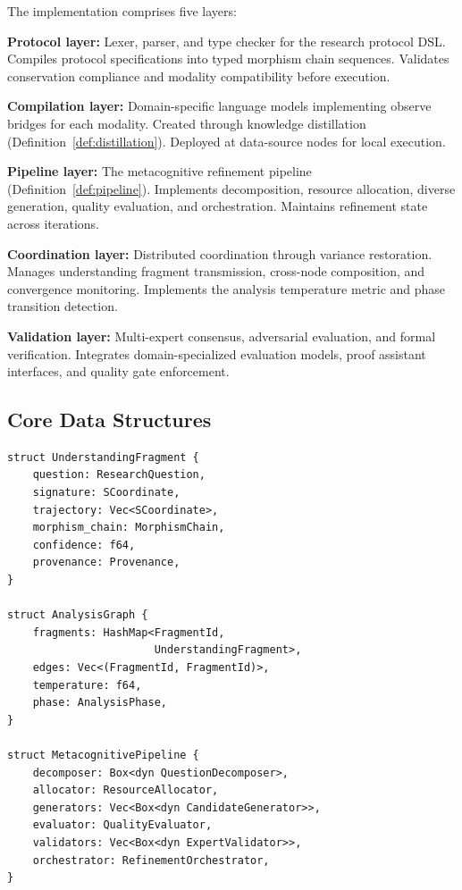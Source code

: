 \documentclass[10pt,twocolumn]{article}
\theoremstyle{definition}
\theoremstyle{remark}
\begin{document}
The implementation comprises five layers:

\textbf{Protocol layer:} Lexer, parser, and type checker for the research protocol DSL. Compiles protocol specifications into typed morphism chain sequences. Validates conservation compliance and modality compatibility before execution.

\textbf{Compilation layer:} Domain-specific language models implementing observe bridges for each modality. Created through knowledge distillation (Definition~\ref{def:distillation}). Deployed at data-source nodes for local execution.

\textbf{Pipeline layer:} The metacognitive refinement pipeline (Definition~\ref{def:pipeline}). Implements decomposition, resource allocation, diverse generation, quality evaluation, and orchestration. Maintains refinement state across iterations.

\textbf{Coordination layer:} Distributed coordination through variance restoration. Manages understanding fragment transmission, cross-node composition, and convergence monitoring. Implements the analysis temperature metric and phase transition detection.

\textbf{Validation layer:} Multi-expert consensus, adversarial evaluation, and formal verification. Integrates domain-specialized evaluation models, proof assistant interfaces, and quality gate enforcement.

\subsection{Core Data Structures}

\begin{verbatim}
struct UnderstandingFragment {
    question: ResearchQuestion,
    signature: SCoordinate,
    trajectory: Vec<SCoordinate>,
    morphism_chain: MorphismChain,
    confidence: f64,
    provenance: Provenance,
}

struct AnalysisGraph {
    fragments: HashMap<FragmentId,
                       UnderstandingFragment>,
    edges: Vec<(FragmentId, FragmentId)>,
    temperature: f64,
    phase: AnalysisPhase,
}

struct MetacognitivePipeline {
    decomposer: Box<dyn QuestionDecomposer>,
    allocator: ResourceAllocator,
    generators: Vec<Box<dyn CandidateGenerator>>,
    evaluator: QualityEvaluator,
    validators: Vec<Box<dyn ExpertValidator>>,
    orchestrator: RefinementOrchestrator,
}
\end{verbatim}
\end{document}
